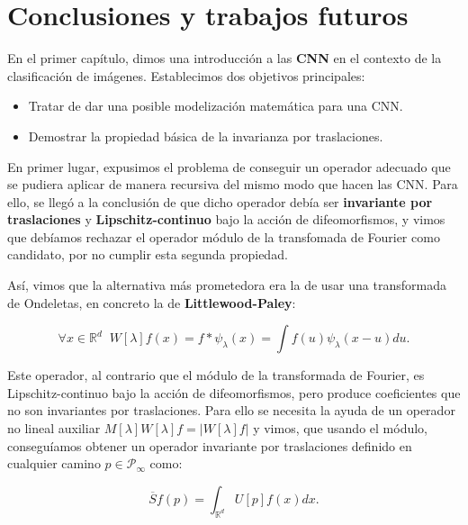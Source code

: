 

\chapter{Conclusiones y trabajos futuros}

\noindent En el primer capítulo, dimos una introducción a las \textbf{CNN} en el contexto de la clasificación de imágenes. Establecimos dos objetivos principales:

\begin{itemize}
  \item Tratar de dar una posible modelización matemática para una CNN.
  \item Demostrar la propiedad básica de la invarianza por traslaciones. 
\end{itemize}


\medskip

\noindent En primer lugar, expusimos el problema de conseguir un operador adecuado que se pudiera aplicar de manera recursiva del mismo modo que hacen las CNN. Para ello, se llegó a la conclusión de que dicho operador debía ser \textbf{invariante por traslaciones} y \textbf{Lipschitz-continuo} bajo la acción de difeomorfismos, y vimos que debíamos rechazar el operador módulo de la transfomada de Fourier como candidato, por no cumplir esta segunda propiedad. 

\medskip

\noindent Así, vimos que la alternativa más prometedora era la de usar una transformada de Ondeletas, en concreto la de \textbf{Littlewood-Paley}:

\begin{equation}
  \forall x \in  \mathbb{R}^d \;\; W[\lambda]f(x)= f \ast \psi_\lambda(x)=\int f(u)\psi_\lambda(x-u) du .
\end{equation}

\noindent Este operador, al contrario que el módulo de la transformada de Fourier, es Lipschitz-continuo bajo la acción de difeomorfismos, pero produce coeficientes que no son invariantes por traslaciones. Para ello se necesita la ayuda de un operador no lineal auxiliar $M[\lambda]W[\lambda]f=|W[\lambda]f|$ y vimos, que usando el módulo, conseguíamos obtener un operador invariante por traslaciones definido en cualquier camino $p \in \mathcal{P}_\infty$ como:

\begin{equation}
  \overline{S}f(p)=\int_{\mathbb{R}^d}U[p]f(x)dx.
\end{equation} 

